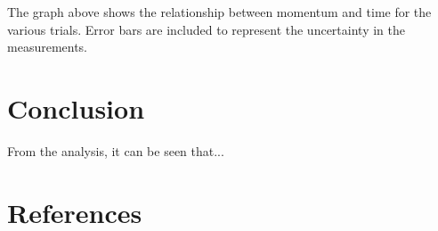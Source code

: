 \documentclass[12pt]{article}
\begin{document}
The graph above shows the relationship between momentum and time for the various trials. Error bars are included to represent the uncertainty in the measurements.

\section{Conclusion}

From the analysis, it can be seen that...

\section{References}




\appendix  
\clearpage
\addappheadtotoc 
\appendixpage 
\end{document}

